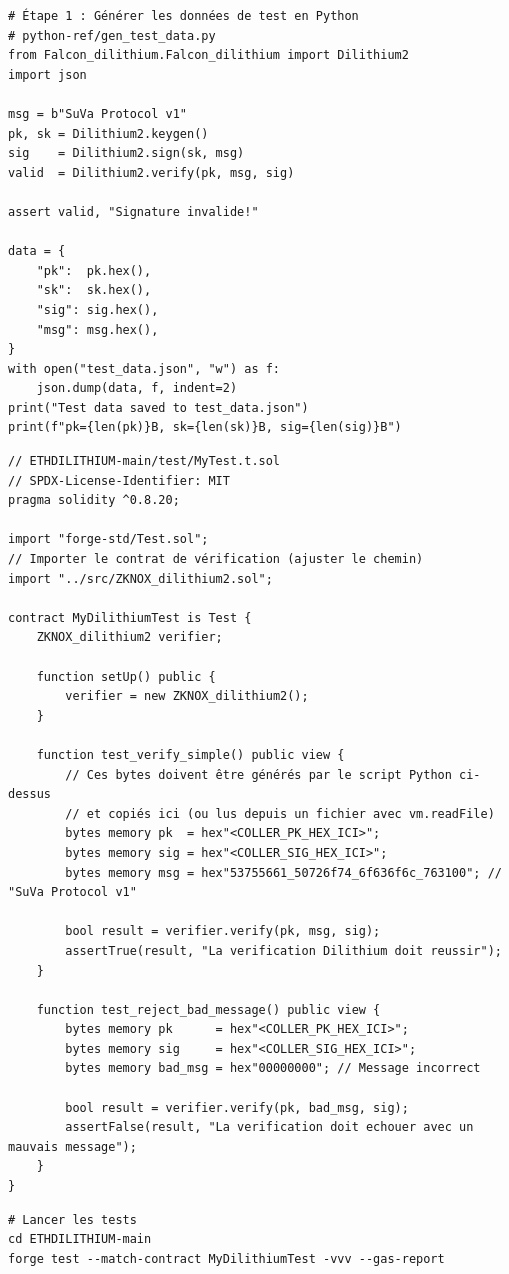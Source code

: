 \documentclass[12pt, a4paper]{article}
\begin{document}
\begin{solution}
\begin{lstlisting}[style=python]
# Étape 1 : Générer les données de test en Python
# python-ref/gen_test_data.py
from Falcon_dilithium.Falcon_dilithium import Dilithium2
import json

msg = b"SuVa Protocol v1"
pk, sk = Dilithium2.keygen()
sig    = Dilithium2.sign(sk, msg)
valid  = Dilithium2.verify(pk, msg, sig)

assert valid, "Signature invalide!"

data = {
    "pk":  pk.hex(),
    "sk":  sk.hex(),
    "sig": sig.hex(),
    "msg": msg.hex(),
}
with open("test_data.json", "w") as f:
    json.dump(data, f, indent=2)
print("Test data saved to test_data.json")
print(f"pk={len(pk)}B, sk={len(sk)}B, sig={len(sig)}B")
\end{lstlisting}

\begin{lstlisting}[style=solidity]
// ETHDILITHIUM-main/test/MyTest.t.sol
// SPDX-License-Identifier: MIT
pragma solidity ^0.8.20;

import "forge-std/Test.sol";
// Importer le contrat de vérification (ajuster le chemin)
import "../src/ZKNOX_dilithium2.sol";

contract MyDilithiumTest is Test {
    ZKNOX_dilithium2 verifier;

    function setUp() public {
        verifier = new ZKNOX_dilithium2();
    }

    function test_verify_simple() public view {
        // Ces bytes doivent être générés par le script Python ci-dessus
        // et copiés ici (ou lus depuis un fichier avec vm.readFile)
        bytes memory pk  = hex"<COLLER_PK_HEX_ICI>";
        bytes memory sig = hex"<COLLER_SIG_HEX_ICI>";
        bytes memory msg = hex"53755661_50726f74_6f636f6c_763100"; // "SuVa Protocol v1"

        bool result = verifier.verify(pk, msg, sig);
        assertTrue(result, "La verification Dilithium doit reussir");
    }

    function test_reject_bad_message() public view {
        bytes memory pk      = hex"<COLLER_PK_HEX_ICI>";
        bytes memory sig     = hex"<COLLER_SIG_HEX_ICI>";
        bytes memory bad_msg = hex"00000000"; // Message incorrect

        bool result = verifier.verify(pk, bad_msg, sig);
        assertFalse(result, "La verification doit echouer avec un mauvais message");
    }
}
\end{lstlisting}

\begin{lstlisting}[style=bash]
# Lancer les tests
cd ETHDILITHIUM-main
forge test --match-contract MyDilithiumTest -vvv --gas-report
\end{lstlisting}
\end{solution}
\end{document}
